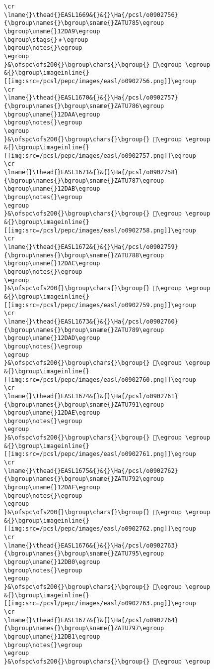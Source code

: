 \begin{verbatim}
\cr
\lname{}\thead{}EASL1669&{}&{}\Ha{/pcsl/o0902756}{\bgroup\names{}\bgroup\sname{}ZATU785\egroup
\bgroup\uname{}12DA9\egroup
\bgroup\stags{}﹟\egroup
\bgroup\notes{}\egroup
\egroup
}&\ofspc\ofs200{}\bgroup\chars{}\bgroup{} 𒶩\egroup \egroup
&{}\bgroup\imageinline{}[[img:src=/pcsl/pepc/images/easl/o0902756.png]]\egroup
\cr
\lname{}\thead{}EASL1670&{}&{}\Ha{/pcsl/o0902757}{\bgroup\names{}\bgroup\sname{}ZATU786\egroup
\bgroup\uname{}12DAA\egroup
\bgroup\notes{}\egroup
\egroup
}&\ofspc\ofs200{}\bgroup\chars{}\bgroup{} 𒶪\egroup \egroup
&{}\bgroup\imageinline{}[[img:src=/pcsl/pepc/images/easl/o0902757.png]]\egroup
\cr
\lname{}\thead{}EASL1671&{}&{}\Ha{/pcsl/o0902758}{\bgroup\names{}\bgroup\sname{}ZATU787\egroup
\bgroup\uname{}12DAB\egroup
\bgroup\notes{}\egroup
\egroup
}&\ofspc\ofs200{}\bgroup\chars{}\bgroup{} 𒶫\egroup \egroup
&{}\bgroup\imageinline{}[[img:src=/pcsl/pepc/images/easl/o0902758.png]]\egroup
\cr
\lname{}\thead{}EASL1672&{}&{}\Ha{/pcsl/o0902759}{\bgroup\names{}\bgroup\sname{}ZATU788\egroup
\bgroup\uname{}12DAC\egroup
\bgroup\notes{}\egroup
\egroup
}&\ofspc\ofs200{}\bgroup\chars{}\bgroup{} 𒶬\egroup \egroup
&{}\bgroup\imageinline{}[[img:src=/pcsl/pepc/images/easl/o0902759.png]]\egroup
\cr
\lname{}\thead{}EASL1673&{}&{}\Ha{/pcsl/o0902760}{\bgroup\names{}\bgroup\sname{}ZATU789\egroup
\bgroup\uname{}12DAD\egroup
\bgroup\notes{}\egroup
\egroup
}&\ofspc\ofs200{}\bgroup\chars{}\bgroup{} 𒶭\egroup \egroup
&{}\bgroup\imageinline{}[[img:src=/pcsl/pepc/images/easl/o0902760.png]]\egroup
\cr
\lname{}\thead{}EASL1674&{}&{}\Ha{/pcsl/o0902761}{\bgroup\names{}\bgroup\sname{}ZATU791\egroup
\bgroup\uname{}12DAE\egroup
\bgroup\notes{}\egroup
\egroup
}&\ofspc\ofs200{}\bgroup\chars{}\bgroup{} 𒶮\egroup \egroup
&{}\bgroup\imageinline{}[[img:src=/pcsl/pepc/images/easl/o0902761.png]]\egroup
\cr
\lname{}\thead{}EASL1675&{}&{}\Ha{/pcsl/o0902762}{\bgroup\names{}\bgroup\sname{}ZATU792\egroup
\bgroup\uname{}12DAF\egroup
\bgroup\notes{}\egroup
\egroup
}&\ofspc\ofs200{}\bgroup\chars{}\bgroup{} 𒶯\egroup \egroup
&{}\bgroup\imageinline{}[[img:src=/pcsl/pepc/images/easl/o0902762.png]]\egroup
\cr
\lname{}\thead{}EASL1676&{}&{}\Ha{/pcsl/o0902763}{\bgroup\names{}\bgroup\sname{}ZATU795\egroup
\bgroup\uname{}12DB0\egroup
\bgroup\notes{}\egroup
\egroup
}&\ofspc\ofs200{}\bgroup\chars{}\bgroup{} 𒶰\egroup \egroup
&{}\bgroup\imageinline{}[[img:src=/pcsl/pepc/images/easl/o0902763.png]]\egroup
\cr
\lname{}\thead{}EASL1677&{}&{}\Ha{/pcsl/o0902764}{\bgroup\names{}\bgroup\sname{}ZATU797\egroup
\bgroup\uname{}12DB1\egroup
\bgroup\notes{}\egroup
\egroup
}&\ofspc\ofs200{}\bgroup\chars{}\bgroup{} 𒶱\egroup \egroup

\end{verbatim}
